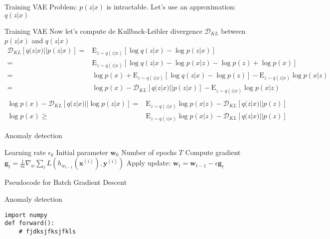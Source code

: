 \documentclass{beamer}
\newcommand{\kldiv}{\mathcal{D}_{KL}}
\newcommand{\E}{\mathrm{E}}
\begin{document}
\begin{frame}{Training VAE}
Problem: $p(z|x)$ is intractable. Let's use an approximation: $q(z|x)$
\end{frame}

\begin{frame}{Training VAE}
Now let's compute de Kullback-Leibler divergence $\kldiv$ between $p(z|x)$ and $q(z|x)$
\scriptsize
\begin{equation*}
\begin{split}
	\kldiv[q(z|x)||p(z|x)] 
	=& \E_{z\sim q(z|x)}[ \log q(z|x) - \log p(z|x)]\\
	=& \E_{z\sim q(z|x)}[ \log q(z|x) - \log p(x|z) - \log p(z) + \log p(x)]\\
	=& \log p(x) + \E_{z\sim q(z|x)}[ \log q(z|x)  - \log p(z)] - \E_{z\sim q(z|x)}\log p(x|z)\\
	=& \log p(x) - \kldiv[q(z|x)||p(z|x)] - \E_{z\sim q(z|x)}\log p(x|z)\\
\end{split}
\end{equation*}
\footnotesize
\begin{equation}
\begin{split}
	\log p(x) - \kldiv[q(z|x)||\log p(z|x)] =& \E_{z\sim q(z|x)}\log p(x|z)- \kldiv[q(z|x)||p(z)]\\
	\log p(x)  \geq& \E_{z\sim q(z|x)}\log p(x|z)- \kldiv[q(z|x)||p(z)]
\end{split}
\end{equation}
\end{frame}

\begin{frame}{Anomaly detection}  
\begin{algorithm}[H]
	\begin{algorithmic}
		\REQUIRE Learning rate $\epsilon_k$
		\REQUIRE Initial parameter $\bm{w}_0$
		\REQUIRE Number of epochs $T$
		\STATE Compute gradient $\bm{g}_t=\frac{1}{m}\nabla_w\sum_i L(h_{w_{t-1}}(\bm{x}^{(i)}), \bm{y}^{(i)})$ 
		\STATE Apply update: $\bm{w}_t=\bm{w}_{t-1}-\epsilon \bm{g}_t$
		\ENDFOR
	\end{algorithmic}
	\caption{Pseudocode for Batch Gradient Descent}
	\label{alg:seq}
\end{algorithm}
\end{frame}

\begin{frame}[fragile]{Anomaly detection}
\begin{verbatim}
import numpy
def forward():
    # fjdksjfksjfkls
\end{verbatim}
\end{frame}
\end{document}
